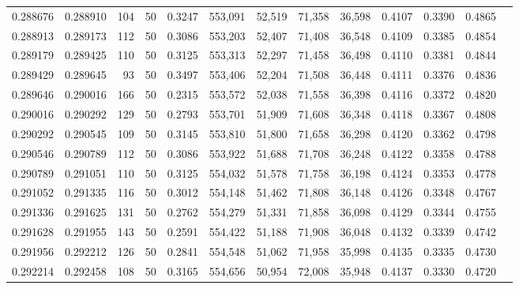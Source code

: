 \begin{tabular}{rrrrrrrrrrrrr}
0.288676 & 0.288910 &   104 &  50 &                                     0.3247 & 553,091 &  52,519 &  71,358 &  36,598 & 0.4107 & 0.3390 & 0.4865 \\
0.288913 & 0.289173 &   112 &  50 &                                     0.3086 & 553,203 &  52,407 &  71,408 &  36,548 & 0.4109 & 0.3385 & 0.4854 \\
0.289179 & 0.289425 &   110 &  50 &                                     0.3125 & 553,313 &  52,297 &  71,458 &  36,498 & 0.4110 & 0.3381 & 0.4844 \\
0.289429 & 0.289645 &    93 &  50 &                                     0.3497 & 553,406 &  52,204 &  71,508 &  36,448 & 0.4111 & 0.3376 & 0.4836 \\
0.289646 & 0.290016 &   166 &  50 &                                     0.2315 & 553,572 &  52,038 &  71,558 &  36,398 & 0.4116 & 0.3372 & 0.4820 \\
0.290016 & 0.290292 &   129 &  50 &                                     0.2793 & 553,701 &  51,909 &  71,608 &  36,348 & 0.4118 & 0.3367 & 0.4808 \\
0.290292 & 0.290545 &   109 &  50 &                                     0.3145 & 553,810 &  51,800 &  71,658 &  36,298 & 0.4120 & 0.3362 & 0.4798 \\
0.290546 & 0.290789 &   112 &  50 &                                     0.3086 & 553,922 &  51,688 &  71,708 &  36,248 & 0.4122 & 0.3358 & 0.4788 \\
0.290789 & 0.291051 &   110 &  50 &                                     0.3125 & 554,032 &  51,578 &  71,758 &  36,198 & 0.4124 & 0.3353 & 0.4778 \\
0.291052 & 0.291335 &   116 &  50 &                                     0.3012 & 554,148 &  51,462 &  71,808 &  36,148 & 0.4126 & 0.3348 & 0.4767 \\
0.291336 & 0.291625 &   131 &  50 &                                     0.2762 & 554,279 &  51,331 &  71,858 &  36,098 & 0.4129 & 0.3344 & 0.4755 \\
0.291628 & 0.291955 &   143 &  50 &                                     0.2591 & 554,422 &  51,188 &  71,908 &  36,048 & 0.4132 & 0.3339 & 0.4742 \\
0.291956 & 0.292212 &   126 &  50 &                                     0.2841 & 554,548 &  51,062 &  71,958 &  35,998 & 0.4135 & 0.3335 & 0.4730 \\
0.292214 & 0.292458 &   108 &  50 &                                     0.3165 & 554,656 &  50,954 &  72,008 &  35,948 & 0.4137 & 0.3330 & 0.4720 \\

\end{tabular}
